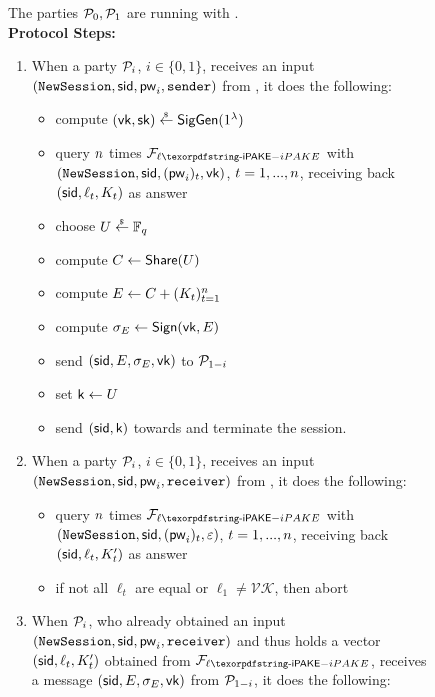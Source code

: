 \begin{figure}[htbp]
  \centering
  \begin{fboxenv}
    \begin{minipage}{0.95\textwidth}
      The parties $\mathcal{P}_{0}, \mathcal{P}_{1}$ are running with \FliPAKE.  \\
      \textbf{Protocol Steps:}
      \begin{enumerate}
      \item
        When a party $\mathcal{P}_{i}$, $i\in\{0,1\}$, receives an input $(\texttt{NewSession},\mathsf{sid},\mathsf{pw}_{i},\texttt{sender})$ from \Env, it does the following:  
        \begin{itemize}
         \item compute $(\mathsf{vk},\mathsf{sk})\stackrel{{}_\$}{\leftarrow}\mathsf{SigGen}(1^{\lambda})$
         \item query $n$ times $\FliPAKE$ with $(\texttt{NewSession},\mathsf{sid},(\mathsf{pw}_{i})_t,\mathsf{vk})$, $t=1,...,n$, receiving back $(\mathsf{sid},\ell_t,K_t)$ as answer
         \item choose $U\stackrel{{}_\$}{\leftarrow} \mathbb{F}_q$ 
         \item compute $C\gets\mathsf{Share}(U)$
         \item compute $E\gets C+(K_t)_{t=1}^{n}$ 
         \item compute $\sigma_E\gets\mathsf{Sign}(\mathsf{vk},E)$
         \item send $(\mathsf{sid},E,\sigma_E,\mathsf{vk})$ to $\mathcal{P}_{1-i}$ 
         \item set $\mathsf{k}\gets U$
         \item send $(\mathsf{sid},\mathsf{k})$ towards \Env and terminate the session.
        \end{itemize}
      \item 
       When a party $\mathcal{P}_{i}$, $i\in\{0,1\}$, receives an input $(\texttt{NewSession},\mathsf{sid},\mathsf{pw}_{i},\texttt{receiver})$ from \Env, it does the following:
       \begin{itemize}
         \item query $n$ times $\FliPAKE$ with $(\texttt{NewSession},\mathsf{sid},(\mathsf{pw}_{i})_t,\varepsilon)$, $t=1,...,n$, receiving back $(\mathsf{sid},\ell_t,K'_t)$ as answer
         \item if not all $\ell_t$ are equal or $\ell_1\neq\mathcal{VK}$, then abort
       \end{itemize}
      \item 
        When $\mathcal{P}_{i}$, who already obtained an input $(\texttt{NewSession},\mathsf{sid},\mathsf{pw}_{i},\texttt{receiver})$ and thus holds a vector $(\mathsf{sid},\ell_t,K'_t)$ obtained from $\FliPAKE$, receives a message $(\mathsf{sid},E,\sigma_E,\mathsf{vk})$ from $\mathcal{P}_{1-i}$, it does the following:

\end{enumerate}
\end{minipage}
\end{fboxenv}
\end{figure}
